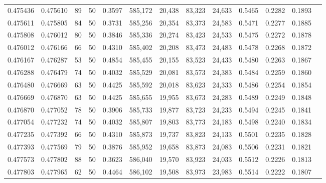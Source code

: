 \begin{tabular}{rrrrrrrrrrrrr}
0.475436 & 0.475610 &    89 &  50 &                                     0.3597 & 585,172 &  20,438 &  83,323 &  24,633 & 0.5465 & 0.2282 & 0.1893 \\
0.475611 & 0.475805 &    84 &  50 &                                     0.3731 & 585,256 &  20,354 &  83,373 &  24,583 & 0.5471 & 0.2277 & 0.1885 \\
0.475808 & 0.476012 &    80 &  50 &                                     0.3846 & 585,336 &  20,274 &  83,423 &  24,533 & 0.5475 & 0.2272 & 0.1878 \\
0.476012 & 0.476166 &    66 &  50 &                                     0.4310 & 585,402 &  20,208 &  83,473 &  24,483 & 0.5478 & 0.2268 & 0.1872 \\
0.476167 & 0.476287 &    53 &  50 &                                     0.4854 & 585,455 &  20,155 &  83,523 &  24,433 & 0.5480 & 0.2263 & 0.1867 \\
0.476288 & 0.476479 &    74 &  50 &                                     0.4032 & 585,529 &  20,081 &  83,573 &  24,383 & 0.5484 & 0.2259 & 0.1860 \\
0.476480 & 0.476669 &    63 &  50 &                                     0.4425 & 585,592 &  20,018 &  83,623 &  24,333 & 0.5486 & 0.2254 & 0.1854 \\
0.476669 & 0.476870 &    63 &  50 &                                     0.4425 & 585,655 &  19,955 &  83,673 &  24,283 & 0.5489 & 0.2249 & 0.1848 \\
0.476870 & 0.477052 &    78 &  50 &                                     0.3906 & 585,733 &  19,877 &  83,723 &  24,233 & 0.5494 & 0.2245 & 0.1841 \\
0.477054 & 0.477232 &    74 &  50 &                                     0.4032 & 585,807 &  19,803 &  83,773 &  24,183 & 0.5498 & 0.2240 & 0.1834 \\
0.477235 & 0.477392 &    66 &  50 &                                     0.4310 & 585,873 &  19,737 &  83,823 &  24,133 & 0.5501 & 0.2235 & 0.1828 \\
0.477393 & 0.477569 &    79 &  50 &                                     0.3876 & 585,952 &  19,658 &  83,873 &  24,083 & 0.5506 & 0.2231 & 0.1821 \\
0.477573 & 0.477802 &    88 &  50 &                                     0.3623 & 586,040 &  19,570 &  83,923 &  24,033 & 0.5512 & 0.2226 & 0.1813 \\
0.477803 & 0.477965 &    62 &  50 &                                     0.4464 & 586,102 &  19,508 &  83,973 &  23,983 & 0.5514 & 0.2222 & 0.1807 \\

\end{tabular}
